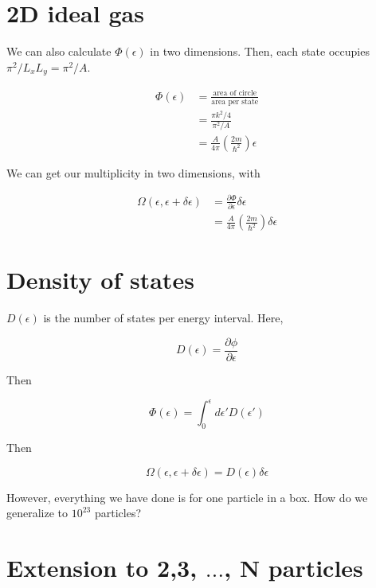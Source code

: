 \documentclass{article}
\newtheorem{one minute paper}[theorem]{One Minute Paper}
\begin{document}
\section*{2D ideal gas}

We can also calculate $\Phi(\epsilon)$ in two dimensions. Then, each state occupies $\pi^2/L_xL_y = \pi^2/A$.

\begin{align}
    \Phi(\epsilon) &= \frac{\text{area of circle}}{\text{area per state}} \\
    &= \frac{\pi k^2/4}{\pi^2/A}\\
    &= \frac{A}{4\pi}\left( \frac{2m}{\hbar^2} \right)\epsilon
\end{align}

We can get our multiplicity in two dimensions, with 

\begin{align}
    \Omega(\epsilon, \epsilon + \delta \epsilon) &= \frac{\partial \Phi}{\partial \epsilon}\delta \epsilon \\
    &= \frac{A}{4\pi}\left( \frac{2m}{\hbar^2} \right)\delta \epsilon
\end{align}

\section*{Density of states}

$D(\epsilon)$ is the number of states per energy interval. Here, 

\begin{equation}
    D(\epsilon) = \frac{\partial \phi}{\partial \epsilon}
\end{equation}

Then 

\begin{equation}
    \Phi(\epsilon) = \int_0^{\epsilon}d\epsilon' D(\epsilon')
\end{equation}

Then 

\begin{equation}
    \Omega(\epsilon, \epsilon + \delta\epsilon) = D(\epsilon) \delta\epsilon
\end{equation}

However, everything we have done is for one particle in a box. How do we generalize to $10^{23}$ particles? 

\section*{Extension to 2,3, $\dots$, N particles}
\end{document}
